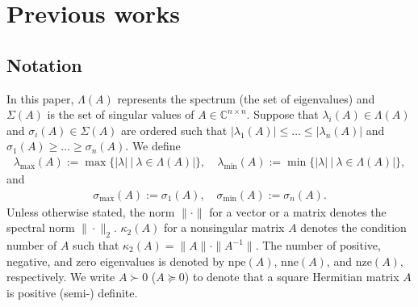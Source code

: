 \section{Previous works}
\label{sec:pre}
\subsection{Notation}

In this paper, $\Lambda(A)$ represents the spectrum (the set of eigenvalues) and $\Sigma(A)$ is the set of singular values of $A\in\mathbb{C}^{n\times n}$.
Suppose that $\lambda_i(A)\in\Lambda(A)$ and $\sigma_i(A)\in\Sigma(A)$ are ordered such that $|\lambda_1(A)|\leq\dots\leq |\lambda_n(A)|$ and $\sigma_1(A)\geq\dots\geq \sigma_n(A)$.
We define
\begin{align}
    \lambda_{\max}(A):=\max\{|\lambda|\ |\ \lambda\in\Lambda(A)|\},\quad \lambda_{\min}(A):=\min\{|\lambda|\ |\ \lambda\in\Lambda(A)|\},\label{eq:lamminmax}
\end{align}
and
\begin{align}
    \sigma_{\max}(A):=\sigma_1(A),\quad \sigma_{\min}(A):=\sigma_{n}(A).\label{eq:sigminmax}
\end{align}
Unless otherwise stated, the norm $\|\cdot\|$ for a vector or a matrix denotes the spectral norm $\|\cdot\|_2$.
$\kappa_2(A)$ for a nonsingular matrix $A$ denotes the condition number of $A$ such that $\kappa_2(A)=\|A\|\cdot\|A^{-1}\|$.
The number of positive, negative, and zero eigenvalues is denoted by $\mathrm{npe}(A)$, $\mathrm{nne}(A)$, and $\mathrm{nze}(A)$, respectively.
We write $A\succ 0$ ($A\succeq 0$) to denote that a square Hermitian matrix $A$ is positive (semi-) definite.

